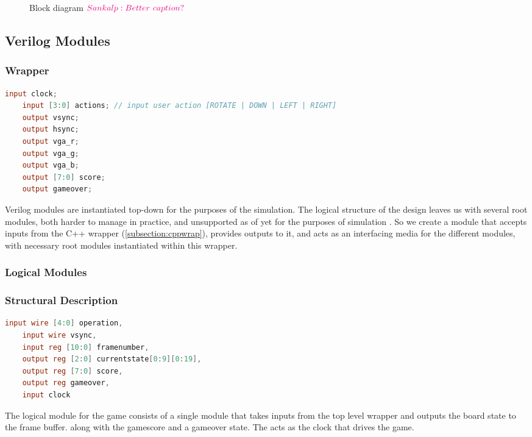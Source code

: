 
\begin{figure}[ht]
    \centering
    
    \caption{Block diagram $\sankalp{Better\ caption?}$}
\label{fig:blockdiag}
\end{figure}

\subsection{Verilog Modules}

\subsubsection{Wrapper}
%
\begin{lstlisting}[language=Verilog]
    input clock;
    input [3:0] actions; // input user action [ROTATE | DOWN | LEFT | RIGHT]
    output vsync;
    output hsync;
    output vga_r;
    output vga_g;
    output vga_b;
    output [7:0] score;
    output gameover;
\end{lstlisting}

Verilog modules are instantiated top-down for the purposes of the 
simulation. The logical structure of the design leaves us with 
several root modules, both harder to manage in practice, and 
unsupported as of yet for the purposes of simulation \cite{verilatortopmod}.
So we create a module that accepts inputs from the C++ wrapper (\ref{subsection:cppwrap}),
provides outputs to it, and acts as an interfacing media for the different
modules, with necessary root modules instantiated within this wrapper.

\subsubsection{Logical Modules}
\label{subsection:logicalmod}
\subsubsection{Structural Description}
\label{subsubsection:Structuraldescr}
\begin{lstlisting}[language=Verilog]
    input wire [4:0] operation,  
    input wire vsync, 
    input reg [10:0] framenumber, 
    output reg [2:0] currentstate[0:9][0:19], 
    output reg [7:0] score,
    output reg gameover,
    input clock
\end{lstlisting}
The logical module for the game consists of a single module that takes inputs from the top level wrapper and outputs the board state to the frame buffer. \newline
along with the gamescore and a gameover state. The  acts as the clock that drives the game.

